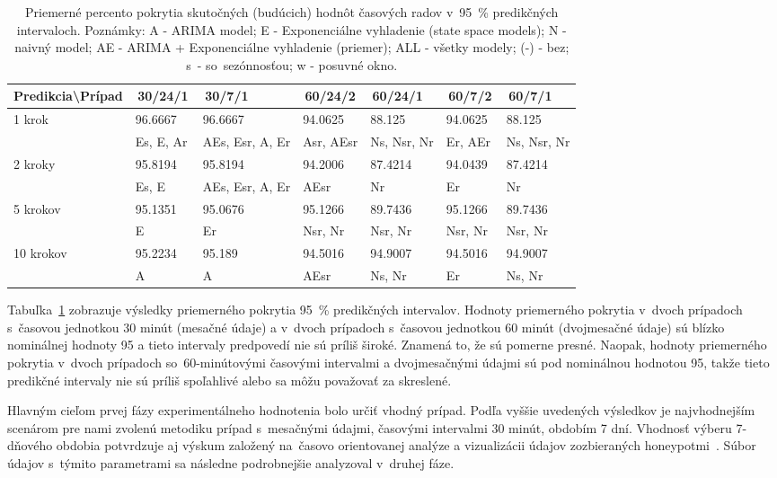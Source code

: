 \documentclass[thesismargins, thesislinespacing, openright, upjsfrontpage]{rnthesis}
\begin{document}
\begin{table}[h]
    \centering
    \footnotesize 
    \begin{tabular}{|p{3cm}|p{1.5cm}|p{1.5cm}|p{1.5cm}|p{1.5cm}|p{1.5cm}|p{1.5cm}|} \hline
        Predikcia\textbackslash Prípad & \,30/24/1\, & \,30/7/1\, & \,60/24/2\, & \,60/24/1\, & \,60/7/2\, & \,60/7/1\, \\
     \hline\hline
        \multirow{2}{*}{1 krok} & 96.6667 & 96.6667 & 94.0625 & 88.125 & 94.0625 & 88.125 \\
        & Es, E, Ar & AEs, Esr, A, Er & Asr, AEsr & Ns, Nsr, Nr & Er, AEr & Ns, Nsr, Nr  \\
        \hline
        \multirow{2}{*}{2 kroky} & 95.8194 & 95.8194 & 94.2006 & 87.4214 & 94.0439 & 87.4214 \\
        & Es, E & AEs, Esr, A, Er & AEsr & Nr & Er & Nr \\
        \hline
        \multirow{2}{*}{5 krokov} & 95.1351 & 95.0676 & 95.1266 & 89.7436 & 95.1266 & 89.7436 \\
        & E & Er & Nsr, Nr & Nsr, Nr & Nsr, Nr & Nsr, Nr  \\
        \hline
        \multirow{2}{*}{10 krokov} & 95.2234 & 95.189 & 94.5016 & 94.9007 & 94.5016 & 94.9007 \\
        & A & A & AEsr & Ns, Nr & Er & Ns, Nr \\
        \hline
    \end{tabular}
    \caption{Priemerné percento pokrytia skutočných (budúcich) hodnôt časových radov v~95~\% predikčných intervaloch. Poznámky: A - ARIMA model; E - Exponenciálne vyhladenie (state space models); N - naivný model; AE - ARIMA + Exponenciálne vyhladenie (priemer); ALL - všetky modely; (-) - bez; s~- so~sezónnosťou; w - posuvné okno.}
    \label{tab:avg_95}
\end{table}

Tabuľka~\ref{tab:avg_95} zobrazuje výsledky priemerného pokrytia 95~\% predikčných intervalov. Hodnoty priemerného pokrytia v~dvoch prípadoch s~časovou jednotkou 30 minút (mesačné údaje) a v~dvoch prípadoch s~časovou jednotkou 60 minút (dvojmesačné údaje) sú blízko nominálnej hodnoty 95 a tieto intervaly predpovedí nie sú príliš široké. Znamená to, že sú pomerne presné. Naopak, hodnoty priemerného pokrytia v~dvoch prípadoch so~60-minútovými časovými intervalmi a dvojmesačnými údajmi sú pod nominálnou hodnotou 95, takže tieto predikčné intervaly nie sú príliš spoľahlivé alebo sa môžu považovať za skreslené.

Hlavným cieľom prvej fázy experimentálneho hodnotenia bolo určiť vhodný prípad. Podľa vyššie uvedených výsledkov je najvhodnejším scenárom pre nami zvolenú metodiku prípad s~mesačnými údajmi, časovými intervalmi 30 minút, obdobím 7 dní. Vhodnosť výberu 7-dňového obdobia potvrdzuje aj výskum založený na~časovo orientovanej analýze a vizualizácii údajov zozbieraných honeypotmi~\cite{sokol2015study}. Súbor údajov s~týmito parametrami sa následne podrobnejšie analyzoval v~druhej fáze.
\end{document}
